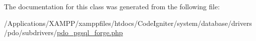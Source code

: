 The documentation for this class was generated from the following file\+:\begin{DoxyCompactItemize}
\item 
/\+Applications/\+X\+A\+M\+P\+P/xamppfiles/htdocs/\+Code\+Igniter/system/database/drivers/pdo/subdrivers/\mbox{\hyperlink{pdo__pgsql__forge_8php}{pdo\+\_\+pgsql\+\_\+forge.\+php}}\end{DoxyCompactItemize}

